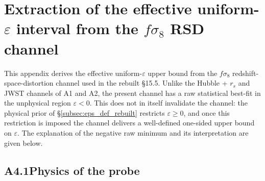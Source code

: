 %
%
%
%

\section{Extraction of the effective uniform-$\varepsilon$ interval
from the $f\sigma_8$ RSD channel}
\label{app:eps_extraction_fsigma8}

This appendix derives the effective uniform-$\varepsilon$ upper
bound from the $f\sigma_8$ redshift-space-distortion channel used
in the rebuilt \S15.5. Unlike the Hubble + $r_s$ and JWST channels
of A1 and A2, the present channel has a raw statistical best-fit
in the unphysical region $\varepsilon < 0$. This does not in
itself invalidate the channel: the physical prior of
\S\ref{subsec:eps_def_rebuilt} restricts $\varepsilon \geq 0$, and
once this restriction is imposed the channel delivers a
well-defined one-sided upper bound on $\varepsilon$. The
explanation of the negative raw minimum and its interpretation
are given below.

\subsection*{A4.1\quad Physics of the probe}


